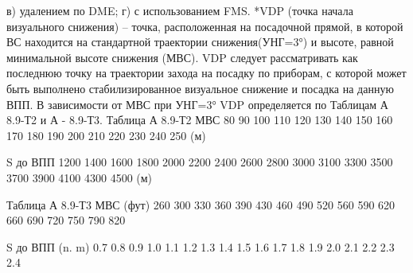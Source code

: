 в)	удалением по DME;
г)	с использованием FMS.
*VDP (точка начала визуального снижения) – точка, расположенная на посадочной прямой, в которой ВС находится на стандартной траектории снижения(УНГ=3°) и высоте, равной минимальной высоте снижения (МВС).
VDP следует рассматривать как последнюю точку на траектории захода на посадку по приборам, с которой может быть выполнено стабилизированное визуальное снижение и посадка на данную ВПП.
В зависимости от МВС при УНГ=3° VDP определяется по Таблицам А 8.9-Т2 и А - 8.9-Т3.
                                                                                                                                               Таблица А 8.9-Т2
МВС	80	90		100		110	120	130		140		150	160	170	180	190	200	210	220	230	240	250
(м)																						
																											
S до																											
ВПП	1200	1400		1600		1800	2000	2200		2400		2600	2800	3000	3100	3300	3500	3700	3900	4100	4300	4500
(м)																											
                                                                                                                     
                                                                                                                                                 Таблица А 8.9-Т3
МВС
(фут)	260	300	330		360		390		430		460		490	520	560	590		620	660	690		720	750	790	820
																									
																											
S до
ВПП
(n. m)																											
	0.7	0.8	0.9		1.0		1.1		1.2		1.3		1.4	1.5	1.6	1.7		1.8	1.9	2.0		2.1	2.2	2.3	2.4
																											

